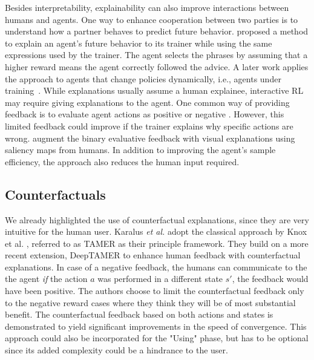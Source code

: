 \documentclass[twoside,11pt]{article}
\begin{document}
Besides interpretability, explainability can also improve interactions between humans and agents. One way to enhance cooperation between two parties is to understand how a partner behaves to predict future behavior. \cite{fukuchi2017autonomous} proposed a method to explain an agent's future behavior to its trainer while using the same expressions used by the trainer. The agent selects the phrases by assuming that a higher reward means the agent correctly followed the advice. A later work applies the approach to agents that change policies dynamically, i.e., agents under training~\citep{fukuchi2017application}. While explanations usually assume a human explainee, interactive RL may require giving explanations to the agent. One common way of providing feedback is to evaluate agent actions as positive or negative \citep{Knox:2008:TAMER,knox:13,arakawa:18,macglashan2017interactive}. However, this limited feedback could improve if the trainer explains why specific actions are wrong. \cite{guan2020explanation} augment the binary evaluative feedback with visual explanations using saliency maps from humans. In addition to improving the agent's sample efficiency, the approach also reduces the human input required. 


\subsection{Counterfactuals}

We already highlighted the use of counterfactual explanations, since they are very intuitive for the human user. Karalus \emph{et al.} adopt the classical approach by Knox et al. \cite{Knox:2008:TAMER}, referred to as TAMER as their principle framework. They build on a more recent extension, DeepTAMER \cite{Warnell:2018:DeepTAMER} to enhance human feedback with counterfactual explanations. In case of a negative feedback, the humans can communicate to the the agent \emph{if} the action $a$ was performed in a different state $s'$, the feedback would have been positive. The authors choose to limit the counterfactual feedback only to the negative reward cases where they think they will be of most substantial benefit. The counterfactual feedback based on both actions and states is demonstrated to yield significant improvements in the speed of convergence. This approach could also be incorporated for the "Using" phase, but has to be optional since its added complexity could be a hindrance to the user.
\end{document}

